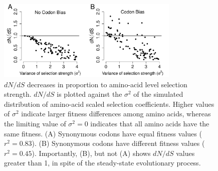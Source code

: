 \documentclass[11pt]{article}
\begin{document}
\begin{figure}[htbp]
	\centerline{\includegraphics[width=8.7cm]{figures/MainText/dnds_variance.pdf}}
	\caption{\label{dnds_variance} $dN/dS$ decreases in proportion to amino-acid level selection strength. $dN/dS$ is plotted against the $\sigma^2 $ of the simulated distribution of amino-acid scaled selection coefficients. Higher values of $\sigma^2$ indicate larger fitness differences among amino acids, whereas the limiting value of $\sigma^2 = 0$ indicates that all amino acids have the same fitness. (A) Synonymous codons have equal fitness values ($r^2=0.83$). (B) Synonymous codons have different fitness values ($r^2=0.45$). Importantly, (B), but not (A) shows $dN/dS$ values greater than 1, in spite of the steady-state evolutionary process.}
\end{figure}
		
		
\vspace{2cm}
		
\end{document}
